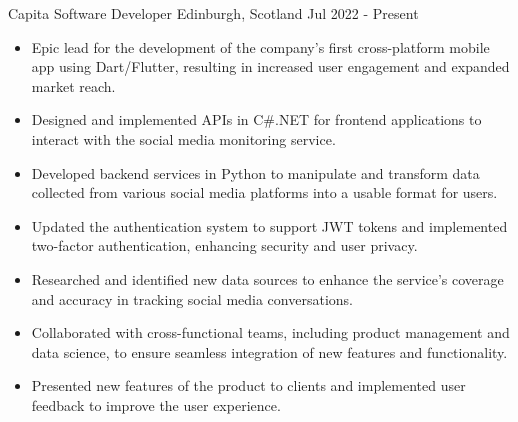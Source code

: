 
  \cventry
    {Capita} %
    {Software Developer} %
    {Edinburgh, Scotland} %
    {Jul 2022 - Present} %
    {
        \begin{itemize}
            \item Epic lead for the development of the company's first 
                cross-platform mobile app using Dart/Flutter, resulting in 
                increased user engagement and expanded market reach.
            \item Designed and implemented APIs in C\#.NET for frontend 
                applications to interact with the social media monitoring 
                service.
            \item Developed backend services in Python to manipulate and 
                transform data collected from various social media platforms 
                into a usable format for users.
            \item Updated the authentication system to support JWT tokens and 
                implemented two-factor authentication, enhancing security and 
                user privacy.
            \item Researched and identified new data sources to enhance the 
                service's coverage and accuracy in tracking social media 
                conversations.
            \item Collaborated with cross-functional teams, including product 
                management and data science, to ensure seamless integration 
                of new features and functionality.
            \item Presented new features of the product to clients and 
                implemented user feedback to improve the user experience.
        \end{itemize}
    }

